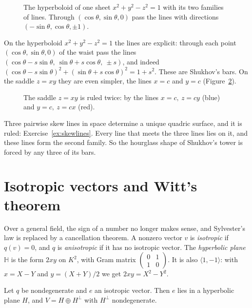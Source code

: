 \begin{figure}[ht]
\centering
{}
\caption{The hyperboloid of one sheet $x^2+y^2-z^2=1$ with its two families of lines. Through $(\cos\theta,\sin\theta,0)$ pass the lines with directions
$(-\sin\theta,\cos\theta,\pm1)$.}
\label{fig:hyperboloid}
\end{figure}

On the hyperboloid $x^2+y^2-z^2=1$ the lines are explicit: through each point $(\cos\theta,\sin\theta,0)$ of the waist pass the lines
$(\cos\theta-s\sin\theta,\ \sin\theta+s\cos\theta,\ \pm s)$, and indeed $(\cos\theta-s\sin\theta)^2+(\sin\theta+s\cos\theta)^2=1+s^2$. These are
Shukhov's bars. On the saddle $z=xy$ they are even simpler, the lines $x=c$ and $y=c$ (Figure~\ref{fig:saddle}).

\begin{figure}[ht]
\centering
{}
\caption{The saddle $z=xy$ is ruled twice: by the lines $x=c,\ z=cy$ (blue) and $y=c,\ z=cx$ (red).}
\label{fig:saddle}
\end{figure}

\begin{beauty}
Three pairwise skew lines in space determine a unique quadric surface, and it is ruled: Exercise~\ref{ex:skewlines}. Every line that meets
the three lines lies on it, and these lines form the second family. So the hourglass shape of Shukhov's tower is forced by any three of its bars.
\end{beauty}

\section{Isotropic vectors and Witt's theorem}

Over a general field, the sign of a number no longer makes sense, and Sylvester's law is replaced by a cancellation theorem. A nonzero vector $v$ is
\emph{isotropic} if $q(v)=0$, and $q$ is \emph{anisotropic} if it has no isotropic vector. The \emph{hyperbolic plane} $\mathbb H$ is the form $2xy$
on $K^2$, with Gram matrix $\begin{pmatrix}0&1\\1&0\end{pmatrix}$. It is also $\langle1,-1\rangle$: with $x=X-Y$ and $y=(X+Y)/2$ we get
$2xy=X^2-Y^2$.

\begin{lemma}\label{lem:hyperbolic}
Let $q$ be nondegenerate and $e$ an isotropic vector. Then $e$ lies in a hyperbolic plane $H$, and $V=H\oplus H^\perp$ with $H^\perp$ nondegenerate.
\end{lemma}


